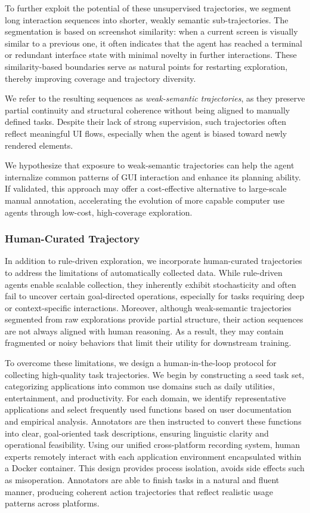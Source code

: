 To further exploit the potential of these unsupervised trajectories, we segment long interaction sequences into shorter, weakly semantic sub-trajectories. The segmentation is based on screenshot similarity: when a current screen is visually similar to a previous one, it often indicates that the agent has reached a terminal or redundant interface state with minimal novelty in further interactions. These similarity-based boundaries serve as natural points for restarting exploration, thereby improving coverage and trajectory diversity.

We refer to the resulting sequences as \textit{weak-semantic trajectories}, as they preserve partial continuity and structural coherence without being aligned to manually defined tasks. Despite their lack of strong supervision, such trajectories often reflect meaningful UI flows, especially when the agent is biased toward newly rendered elements.

We hypothesize that exposure to weak-semantic trajectories can help the agent internalize common patterns of GUI interaction and enhance its planning ability. If validated, this approach may offer a cost-effective alternative to large-scale manual annotation, accelerating the evolution of more capable computer use agents through low-cost, high-coverage exploration.


\subsubsection{Human-Curated Trajectory}
In addition to rule-driven exploration, we incorporate human-curated trajectories to address the limitations of automatically collected data. While rule-driven agents enable scalable collection, they inherently exhibit stochasticity and often fail to uncover certain goal-directed operations, especially for tasks requiring deep or context-specific interactions. Moreover, although weak-semantic trajectories segmented from raw explorations provide partial structure, their action sequences are not always aligned with human reasoning. As a result, they may contain fragmented or noisy behaviors that limit their utility for downstream training.

To overcome these limitations, we design a human-in-the-loop protocol for collecting high-quality task trajectories. We begin by constructing a seed task set, categorizing applications into common use domains such as daily utilities, entertainment, and productivity. For each domain, we identify representative applications and select frequently used functions based on user documentation and empirical analysis. Annotators are then instructed to convert these functions into clear, goal-oriented task descriptions, ensuring linguistic clarity and operational feasibility.
% 
Using our unified cross-platform recording system, human experts remotely interact with each application environment encapsulated within a Docker container. This design provides process isolation, avoids side effects such as misoperation. Annotators are able to finish tasks in a natural and fluent manner, producing coherent action trajectories that reflect realistic usage patterns across platforms.

